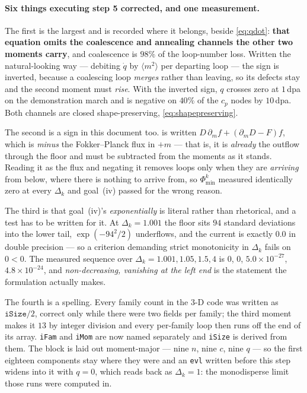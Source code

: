 \documentclass{article}
\begin{document}
\paragraph{Six things executing step 5 corrected, and one measurement.} The
first is the largest and is recorded where it belongs, beside \cref{eq:qdot}:
\textbf{that equation omits the coalescence and annealing channels the other two
moments carry}, and coalescence is $98\%$ of the loop-number loss. Written the
natural-looking way --- debiting $\dot q$ by $\langle m^2\rangle$ per departing
loop --- the sign is inverted, because a coalescing loop \emph{merges} rather
than leaving, so its defects stay and the second moment must \emph{rise}. With
the inverted sign, $q$ crosses zero at $1$\,dpa on the demonstration march and
is negative on $40\%$ of the $c_p$ nodes by $10$\,dpa. Both channels are closed
shape-preserving, \cref{eq:shapepreserving}.

The second is a sign in this document too.  is written
$D\,\partial_m f+(\partial_m D-F)f$, which is \emph{minus} the Fokker--Planck
flux in $+m$ --- that is, it is \emph{already} the outflow through the floor and
must be subtracted from the moments as it stands. Reading it as the flux and
negating it removes loops only when they are \emph{arriving} from below, where
there is nothing to arrive from, so $\Phi^k_{\min}$ measured identically zero at
every $\Delta_k$ and goal~(iv) passed for the wrong reason.

The third is that goal~(iv)'s \emph{exponentially} is literal rather than
rhetorical, and a test has to be written for it. At $\Delta_k=1.001$ the floor
sits $94$ standard deviations into the lower tail, $\exp(-94^2/2)$ underflows,
and the current is exactly $0.0$ in double precision --- so a criterion
demanding strict monotonicity in $\Delta_k$ fails on $0<0$. The measured
sequence over $\Delta_k=1.001,1.05,1.5,4$ is $0$, $0$, $5.0\times10^{-27}$,
$4.8\times10^{-24}$, and \emph{non-decreasing, vanishing at the left end} is the
statement the formulation actually makes.

The fourth is a spelling. Every family count in the $3$-D code was written as
$\texttt{iSize}/2$, correct only while there were two fields per family; the
third moment makes it $13$ by integer division and every per-family loop then
runs off the end of its array. \texttt{iFam} and \texttt{iMom} are now named
separately and \texttt{iSize} is derived from them. The block is laid out
moment-major --- nine $n$, nine $c$, nine $q$ --- so the first eighteen
components stay where they were and an \texttt{evl} written before this step
widens into it with $q=0$, which reads back as $\Delta_k=1$: the monodisperse
limit those runs were computed in.
\end{document}
